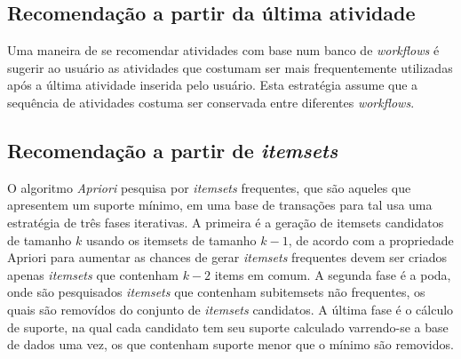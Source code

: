 \subsection{Recomendação a partir da última atividade}
Uma maneira de se recomendar atividades com base num banco de \emph{workflows} é sugerir ao usuário as atividades que costumam ser mais frequentemente utilizadas após a última atividade inserida pelo usuário. Esta estratégia assume que a sequência de atividades costuma ser conservada entre diferentes \emph{workflows}.

\subsection{Recomendação a partir de \emph{itemsets}}\label{AAPRIORI}
O algoritmo \emph{Apriori} \cite{Agrawal1994} pesquisa por \emph{itemsets} frequentes, que são aqueles que apresentem um suporte mínimo, em uma base de transações para tal usa uma estratégia de três fases iterativas. A primeira é a geração de itemsets candidatos de tamanho \(k\) usando os itemsets de tamanho \(k-1\), de acordo com a propriedade Apriori para aumentar as chances de gerar \emph{itemsets} frequentes devem ser criados apenas \emph{itemsets} que contenham \(k-2\) items em comum. A segunda fase é a poda, onde são pesquisados \emph{itemsets} que contenham subitemsets não frequentes, os quais são removídos do conjunto de \emph{itemsets} candidatos. A última fase é o cálculo de suporte, na qual cada candidato tem seu suporte calculado varrendo-se a base de dados uma vez, os que contenham suporte menor que o mínimo são removidos. 

